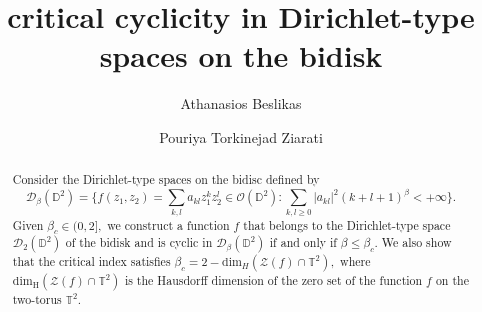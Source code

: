 \documentclass[a4paper,12pt]{amsart}
\theoremstyle{definition}
\begin{document}
	
	\title[critical cyclicity in Dirichlet-type spaces on the bidisk]
	{critical cyclicity in Dirichlet-type spaces on the bidisk}

    \author[Beslikas]{Athanasios Beslikas}
\address{A. Beslikas \\Doctoral School of Exact and Natural Studies,
Institute of Mathematics,
Faculty of Mathematics and Computer Science,
Jagiellonian University,
\L{}ojasiewicza 6, PL30348, Cracow, Poland}
	
	\author[Torkinejad Ziarati]{Pouriya Torkinejad Ziarati}
	
	\address{P.T.Ziarati\\
		Institut de Math\'ematiques de Toulouse; UMR5219 \\
		Universit\'e de Toulouse; CNRS \\
		UPS, F-31062 Toulouse Cedex 9, France} 
	

    
	\begin{abstract} Consider the Dirichlet-type spaces on the bidisc defined by 
    $$\mathcal{D}_{\beta}(\mathbb{D}^2)=\Bigg\{f(z_1,z_2)=\sum_{k,l}a_{kl}z_1^kz_2^l\in\mathcal{O}(\mathbb{D}^2): \sum_{k,l\ge 0}|a_{kl}|^2(k+l+1)^{\beta}<+\infty\Bigg\}.$$
    Given $\beta_c\in(0,2],$ we construct a function $f$ that belongs to the Dirichlet-type space $\mathcal D_{2}(\mathbb{D}^2)$ of the bidisk and is cyclic in $\mathcal D_\beta(\mathbb{D}^2)$ if and only if $\beta\leq \beta_{c}.$ We also show that the critical index satisfies $\beta_c=2-\mathrm{dim}_H(\mathcal{Z}(f)\cap \mathbb{T}^2),$ where $\mathrm{dim_H}(\mathcal{Z}(f)\cap \mathbb{T}^2)$ is the Hausdorff dimension of the zero set of the function $f$ on the two-torus $\mathbb{T}^2.$   
              
        \end{abstract}

	
	
	
	
	\maketitle
\end{document}
